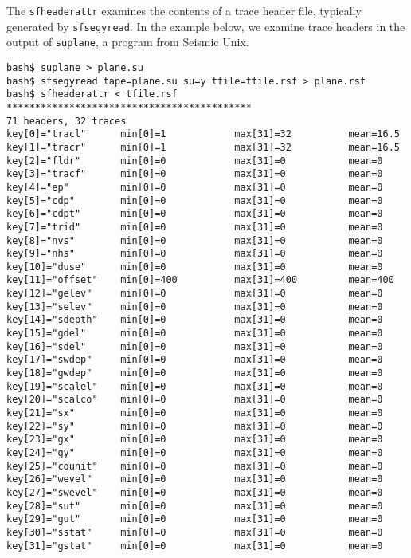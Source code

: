 The \texttt{sfheaderattr} examines the contents of a trace header file,
typically generated by \texttt{sfsegyread}. In the example below, we examine
trace headers in the output of \texttt{suplane}, a program from Seismic Unix.
\begin{verbatim}
bash$ suplane > plane.su
bash$ sfsegyread tape=plane.su su=y tfile=tfile.rsf > plane.rsf
bash$ sfheaderattr < tfile.rsf
*******************************************
71 headers, 32 traces
key[0]="tracl"      min[0]=1            max[31]=32          mean=16.5
key[1]="tracr"      min[0]=1            max[31]=32          mean=16.5
key[2]="fldr"       min[0]=0            max[31]=0           mean=0
key[3]="tracf"      min[0]=0            max[31]=0           mean=0
key[4]="ep"         min[0]=0            max[31]=0           mean=0
key[5]="cdp"        min[0]=0            max[31]=0           mean=0
key[6]="cdpt"       min[0]=0            max[31]=0           mean=0
key[7]="trid"       min[0]=0            max[31]=0           mean=0
key[8]="nvs"        min[0]=0            max[31]=0           mean=0
key[9]="nhs"        min[0]=0            max[31]=0           mean=0
key[10]="duse"      min[0]=0            max[31]=0           mean=0
key[11]="offset"    min[0]=400          max[31]=400         mean=400
key[12]="gelev"     min[0]=0            max[31]=0           mean=0
key[13]="selev"     min[0]=0            max[31]=0           mean=0
key[14]="sdepth"    min[0]=0            max[31]=0           mean=0
key[15]="gdel"      min[0]=0            max[31]=0           mean=0
key[16]="sdel"      min[0]=0            max[31]=0           mean=0
key[17]="swdep"     min[0]=0            max[31]=0           mean=0
key[18]="gwdep"     min[0]=0            max[31]=0           mean=0
key[19]="scalel"    min[0]=0            max[31]=0           mean=0
key[20]="scalco"    min[0]=0            max[31]=0           mean=0
key[21]="sx"        min[0]=0            max[31]=0           mean=0
key[22]="sy"        min[0]=0            max[31]=0           mean=0
key[23]="gx"        min[0]=0            max[31]=0           mean=0
key[24]="gy"        min[0]=0            max[31]=0           mean=0
key[25]="counit"    min[0]=0            max[31]=0           mean=0
key[26]="wevel"     min[0]=0            max[31]=0           mean=0
key[27]="swevel"    min[0]=0            max[31]=0           mean=0
key[28]="sut"       min[0]=0            max[31]=0           mean=0
key[29]="gut"       min[0]=0            max[31]=0           mean=0
key[30]="sstat"     min[0]=0            max[31]=0           mean=0
key[31]="gstat"     min[0]=0            max[31]=0           mean=0

\end{verbatim}
